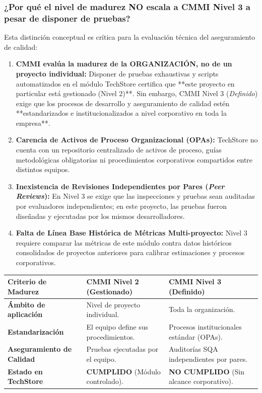 \documentclass{article}
\begin{document}
\subsubsection{¿Por qué el nivel de madurez NO escala a CMMI Nivel 3 a pesar de disponer de pruebas?}
Esta distinción conceptual es crítica para la evaluación técnica del aseguramiento de calidad:

\begin{enumerate}[leftmargin=*]
\item \textbf{CMMI evalúa la madurez de la ORGANIZACIÓN, no de un proyecto individual:} Disponer de pruebas exhaustivas y scripts automatizados en el módulo TechStore certifica que **este proyecto en particular está gestionado (Nivel 2)**. Sin embargo, CMMI Nivel 3 (\textit{Definido}) exige que los procesos de desarrollo y aseguramiento de calidad estén **estandarizados e institucionalizados a nivel corporativo en toda la empresa**.
\item \textbf{Carencia de Activos de Proceso Organizacional (OPAs):} TechStore no cuenta con un repositorio centralizado de activos de proceso, guías metodológicas obligatorias ni procedimientos corporativos compartidos entre distintos equipos.
\item \textbf{Inexistencia de Revisiones Independientes por Pares (\textit{Peer Reviews}):} En Nivel 3 se exige que las inspecciones y pruebas sean auditadas por evaluadores independientes; en este proyecto, las pruebas fueron diseñadas y ejecutadas por los mismos desarrolladores.
\item \textbf{Falta de Línea Base Histórica de Métricas Multi-proyecto:} Nivel 3 requiere comparar las métricas de este módulo contra datos históricos consolidados de proyectos anteriores para calibrar estimaciones y procesos corporativos.
\end{enumerate}

\begin{center}
\begin{tabular}{|p{}|p{}|p{}|}
\hline
\textbf{Criterio de Madurez} & \textbf{CMMI Nivel 2 (Gestionado)} & \textbf{CMMI Nivel 3 (Definido)}\\ \hline
\textbf{Ámbito de aplicación} & Nivel de proyecto individual. & Toda la organización.\\ \hline
\textbf{Estandarización} & El equipo define sus procedimientos. & Procesos institucionales estándar (OPAs).\\ \hline
\textbf{Aseguramiento de Calidad} & Pruebas ejecutadas por el equipo. & Auditorías SQA independientes por pares.\\ \hline
\textbf{Estado en TechStore} & \textbf{CUMPLIDO} (Módulo controlado). & \textbf{NO CUMPLIDO} (Sin alcance corporativo).\\
\hline
\end{tabular}
\end{center}
\end{document}
